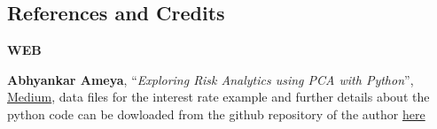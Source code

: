 \documentclass{article}
\begin{document}
    \subsection{References and Credits}\label{references-and-credits}

    \textbf{WEB}

\textbf{Abhyankar Ameya}, ``\emph{Exploring Risk Analytics using PCA
with Python}'',
\href{https://abhyankar-ameya.medium.com/exploring-risk-analytics-using-pca-with-python-3aca369cbfe4}{Medium},
data files for the interest rate example and further details about the
python code can be dowloaded from the github repository of the author
\href{https://github.com/Ameya1983/TheAlchemist}{here}


    
    
    
\end{document}

